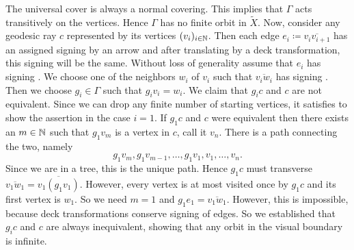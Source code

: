 \begin{bsp}[\(\R^d\)]
  The universal cover is always a normal covering. This implies that \(\Gamma\) acts transitively on the vertices. Hence \(\Gamma\) has no finite orbit in \(\tilde X\). Now, consider any geodesic ray \(c\) represented by its vertices \((v_i)_{i \in \mathbb{N}}\). Then each edge \(e_i \coloneqq \overline{v_iv_{i+1}}\) has an assigned signing by an arrow and after translating by a deck transformation, this signing will be the same. Without loss of generality assume that \(e_i\) has signing . We choose one of the neighbors \(w_i\) of \(v_i\) such that \(\overline{v_iw_i}\) has signing . Then we choose \(g_i \in \Gamma\) such that \(g_iv_i = w_i\). We claim that \(g_ic\) and \(c\) are not equivalent. Since we can drop any finite number of starting vertices, it satisfies to show the assertion in the case \(i=1\). If \(g_1c\) and \(c\) were equivalent then there exists an \(m \in \mathbb{N}\) such that \(g_1v_m\) is a vertex in \(c\), call it \(v_n\). There is a path connecting the two, namely
  \[
    g_1v_m, g_1v_{m-1}, \dots, g_1v_1, v_1, \dots, v_n.
  \]
  Since we are in a tree, this is the unique path. Hence \(g_1c\) must transverse \(\overline{v_1w_1} = \overline{v_1 (g_1v_1)}\). However, every vertex is at most visited once by \(g_1c\) and its first vertex is \(w_1\). So we need \(m=1\) and \(g_1e_1 = \overline{v_1w_1}\). However, this is impossible, because deck transformations conserve signing of edges. So we established that \(g_ic\) and \(c\) are always inequivalent, showing that any orbit in the visual boundary is infinite.



\end{bsp}
